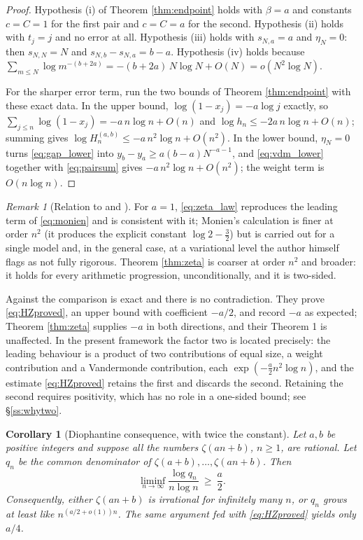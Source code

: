 \documentclass[11pt]{amsart}
\numberwithin{equation}{section}
\theoremstyle{plain}
\newtheorem{corollary}[theorem]{Corollary}
\theoremstyle{definition}
\theoremstyle{remark}
\newtheorem{remark}[theorem]{Remark}
\begin{document}
\begin{proof}
Hypothesis (i) of Theorem \ref{thm:endpoint} holds with $\beta=a$ and constants $c=C=1$ for the
first pair and $c=C=a$ for the second. Hypothesis (ii) holds with $t_{j}=j$ and no error at all.
Hypothesis (iii) holds with $s_{N,a}=a$ and $\eta_{N}=0$: then $s_{N,N}=N$ and
$s_{N,b}-s_{N,a}=b-a$. Hypothesis (iv) holds because
$\sum_{m\le N}\log m^{-(b+2a)}=-(b+2a)\,N\log N+O(N)=o(N^{2}\log N)$.

For the sharper error term, run the two bounds of Theorem \ref{thm:endpoint} with these exact data.
In the upper bound, $\log(1-x_{j})=-a\log j$ exactly, so
$\sum_{j\le n}\log(1-x_{j})=-a\,n\log n+O(n)$ and $\log h_{n}\le-2a\,n\log n+O(n)$; summing gives
$\log H_{n}^{(a,b)}\le-a\,n^{2}\log n+O(n^{2})$. In the lower bound, $\eta_{N}=0$ turns
\eqref{eq:gap_lower} into $y_{b}-y_{a}\ge a(b-a)N^{-a-1}$, and \eqref{eq:vdm_lower} together with
\eqref{eq:pairsum} gives $-a\,n^{2}\log n+O(n^{2})$; the weight term is $O(n\log n)$.
\end{proof}

\begin{remark}[Relation to \cite{Monien2009} and \cite{HaynesZudilin2015}]
\label{rem:position}
For $a=1$, \eqref{eq:zeta_law} reproduces the leading term of \eqref{eq:monien} and is consistent
with it; Monien's calculation is finer at order $n^{2}$ (it produces the explicit constant
$\log 2-\tfrac32$) but is carried out for a single model and, in the general case, at a variational
level the author himself flags as not fully rigorous. Theorem \ref{thm:zeta} is coarser at order
$n^{2}$ and broader: it holds for every arithmetic progression, unconditionally, and it is two-sided.

Against \cite{HaynesZudilin2015} the comparison is exact and there is no contradiction. They prove
\eqref{eq:HZproved}, an upper bound with coefficient $-a/2$, and record $-a$ as expected; Theorem
\ref{thm:zeta} supplies $-a$ in both directions, and their Theorem 1 is unaffected. In the present
framework the factor two is located precisely: the leading behaviour is a product of two
contributions of equal size, a weight contribution and a Vandermonde contribution, each
$\exp(-\tfrac a2n^{2}\log n)$, and the estimate \eqref{eq:HZproved} retains the first and discards
the second. Retaining the second requires positivity, which has no role in a one-sided bound; see
\S\ref{ss:whytwo}.
\end{remark}

\begin{corollary}[Diophantine consequence, with twice the constant]
\label{cor:diophantine}
Let $a,b$ be positive integers and suppose all the numbers $\zeta(an+b)$, $n\ge1$, are rational.
Let $q_{n}$ be the common denominator of $\zeta(a+b),\dots,\zeta(an+b)$. Then
\begin{equation}
\liminf_{n\to\infty}\frac{\log q_{n}}{n\log n}\ \ge\ \frac a2 .
\end{equation}
Consequently, either $\zeta(an+b)$ is irrational for infinitely many $n$, or $q_{n}$ grows at least
like $n^{(a/2+o(1))n}$. The same argument fed with \eqref{eq:HZproved} yields only $a/4$.
\end{corollary}
\end{document}
